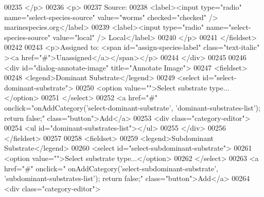 \begin{DoxyCode}
00235                 </p>
00236                 <p>
00237                     Source:
00238                     <label><input type=\textcolor{stringliteral}{"radio"} name=\textcolor{stringliteral}{"select-species-source"} 
      value=\textcolor{stringliteral}{"worms"} checked=\textcolor{stringliteral}{"checked"} /> marinespecies.org</label>
00239                     <label><input type=\textcolor{stringliteral}{"radio"} name=\textcolor{stringliteral}{"select-species-source"} 
      value=\textcolor{stringliteral}{"local"} /> Local</label>
00240                 </p>
00241             </fieldset>
00242 
00243             <p>Assigned to: <span \textcolor{keywordtype}{id}=\textcolor{stringliteral}{"assign-species-label"} \textcolor{keyword}{class}=\textcolor{stringliteral}{"text-italic"}
      ><a href=\textcolor{stringliteral}{"#"}>Unassigned</a></span></p>
00244         </div>
00245 
00246         <div \textcolor{keywordtype}{id}=\textcolor{stringliteral}{"dialog-annotate-image"} title=\textcolor{stringliteral}{"Annotate Image"}>
00247             <fieldset>
00248                 <legend>Dominant Substrate</legend>
00249                 <select \textcolor{keywordtype}{id}=\textcolor{stringliteral}{"select-dominant-substrate"}>
00250                     <option value=\textcolor{stringliteral}{""}>Select substrate type...</option>
00251                 </select>
00252                 <a href=\textcolor{stringliteral}{"#"} onclick=\textcolor{stringliteral}{"onAddCategory('select-dominant-substrate',
       'dominant-substrates-list'); return false;"} \textcolor{keyword}{class}=\textcolor{stringliteral}{"button"}>Add</a>
00253                 <div \textcolor{keyword}{class}=\textcolor{stringliteral}{"category-editor"}>
00254                     <ul \textcolor{keywordtype}{id}=\textcolor{stringliteral}{"dominant-substrates-list"}></ul>
00255                 </div>
00256             </fieldset>
00257 
00258             <fieldset>
00259                 <legend>Subdominant Substrate</legend>
00260                 <select \textcolor{keywordtype}{id}=\textcolor{stringliteral}{"select-subdominant-substrate"}>
00261                     <option value=\textcolor{stringliteral}{""}>Select substrate type...</option>
00262                 </select>
00263                 <a href=\textcolor{stringliteral}{"#"} onclick=\textcolor{stringliteral}{"
      onAddCategory('select-subdominant-substrate', 'subdominant-substrates-list'); return false;"} \textcolor{keyword}{class}=\textcolor{stringliteral}{"button"}>Add</a>
00264                 <div \textcolor{keyword}{class}=\textcolor{stringliteral}{"category-editor"}>

\end{DoxyCode}
